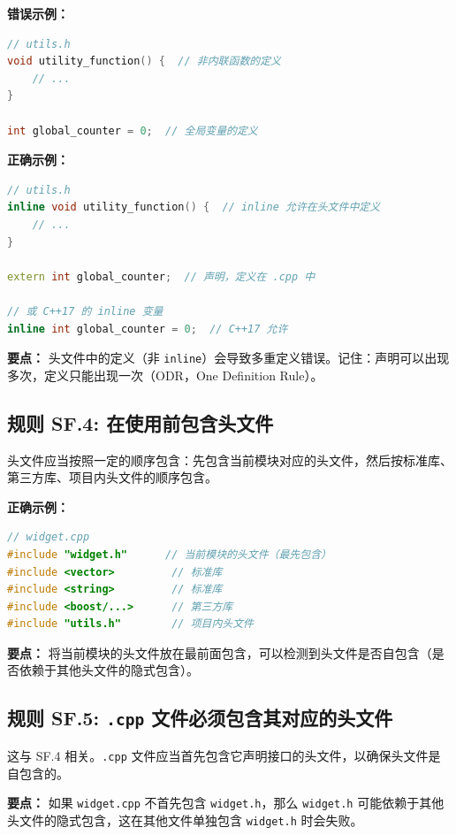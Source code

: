 \textbf{错误示例：}

\begin{lstlisting}[language=C++]
// utils.h
void utility_function() {  // 非内联函数的定义
    // ...
}

int global_counter = 0;  // 全局变量的定义
\end{lstlisting}

\textbf{正确示例：}

\begin{lstlisting}[language=C++]
// utils.h
inline void utility_function() {  // inline 允许在头文件中定义
    // ...
}

extern int global_counter;  // 声明，定义在 .cpp 中

// 或 C++17 的 inline 变量
inline int global_counter = 0;  // C++17 允许
\end{lstlisting}

\textbf{要点：} 头文件中的定义（非 \texttt{inline}）会导致多重定义错误。记住：声明可以出现多次，定义只能出现一次（ODR，One Definition Rule）。

\subsection*{\textbf{规则 SF.4:} 在使用前包含头文件}

头文件应当按照一定的顺序包含：先包含当前模块对应的头文件，然后按标准库、第三方库、项目内头文件的顺序包含。

\textbf{正确示例：}

\begin{lstlisting}[language=C++]
// widget.cpp
#include "widget.h"      // 当前模块的头文件（最先包含）
#include <vector>         // 标准库
#include <string>         // 标准库
#include <boost/...>      // 第三方库
#include "utils.h"        // 项目内头文件
\end{lstlisting}

\textbf{要点：} 将当前模块的头文件放在最前面包含，可以检测到头文件是否自包含（是否依赖于其他头文件的隐式包含）。

\subsection*{\textbf{规则 SF.5:} \texttt{.cpp} 文件必须包含其对应的头文件}

这与 SF.4 相关。\texttt{.cpp} 文件应当首先包含它声明接口的头文件，以确保头文件是自包含的。

\textbf{要点：} 如果 \texttt{widget.cpp} 不首先包含 \texttt{widget.h}，那么 \texttt{widget.h} 可能依赖于其他头文件的隐式包含，这在其他文件单独包含 \texttt{widget.h} 时会失败。

